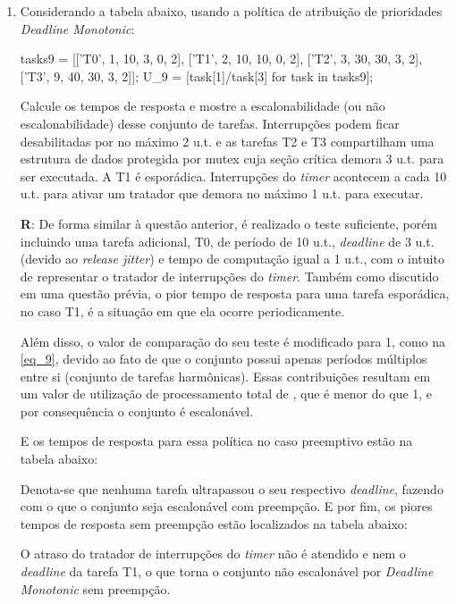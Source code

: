 \documentclass[
	10pt,				%
	openright,			%
	oneside,			%
	a4paper,			%
	english,			%
	french,				%
	spanish,			%
	brazil,				%
	]{abntex2}
\newcommand{\ª}{%
\textordfeminine
}
\begin{document}
\begin{enumerate}
\item Considerando a tabela abaixo, usando a política de atribuição de prioridades \textit{Deadline Monotonic}:

\begin{sagesilent}
tasks9 = [['T0', 1, 10, 3, 0, 2], ['T1', 2, 10, 10, 0, 2], ['T2', 3, 30, 30, 3, 2], ['T3', 9, 40, 30, 3, 2]];
U_9 = [task[1]/task[3] for task in tasks9];
\end{sagesilent}

\begin{center}
\end{center}

Calcule os tempos de resposta e mostre a escalonabilidade (ou não escalonabilidade) desse conjunto
 de tarefas. Interrupções podem ficar desabilitadas por no máximo 2 u.t. e as tarefas T2 e T3
compartilham uma estrutura de dados protegida por mutex cuja seção crítica demora 3 u.t. para
ser executada. A T1 é esporádica. Interrupções do \textit{timer} acontecem a cada 10 u.t. para ativar um
tratador que demora no máximo 1 u.t. para executar.

\textbf{R}: De forma similar à questão anterior, é realizado o teste suficiente, porém incluindo uma tarefa adicional, T0, de período de 10 u.t., \textit{deadline} de 3 u.t. (devido ao \textit{release jitter}) e 
tempo de computação igual a 1 u.t., com o intuito de representar o tratador de interrupções do \textit{timer}. Também como discutido em uma questão prévia, o pior tempo de resposta
para uma tarefa esporádica, no caso T1, é a situação em que ela ocorre periodicamente. 

Além disso, o valor de comparação do seu teste é modificado para 1, como na \autoref{eq_9}, devido ao fato de que o conjunto possui apenas períodos múltiplos entre si (conjunto de tarefas harmônicas). Essas 
contribuições resultam em um valor de utilização de processamento total de , que é menor do que 1, e por consequência o conjunto é escalonável.

E os tempos de resposta para essa política no caso preemptivo estão na tabela abaixo:
\begin{center}
\end{center}
Denota-se que nenhuma tarefa ultrapassou o seu respectivo \textit{deadline}, fazendo com o que o conjunto seja escalonável com preempção. 
E por fim, os piores tempos de resposta sem preempção estão localizados na tabela abaixo:
\begin{center}
\end{center}
O atraso do tratador de interrupções do \textit{timer} não é atendido e nem o \textit{deadline} da tarefa T1, o que torna o conjunto não escalonável por \textit{Deadline Monotonic} sem preempção.

\end{enumerate}
\end{document}
